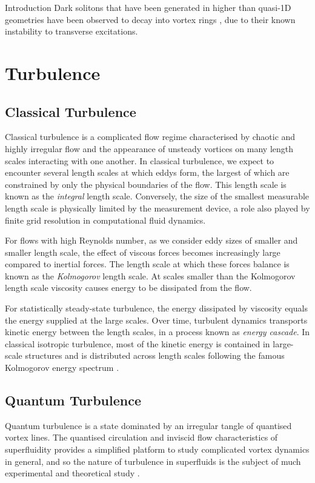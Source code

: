 \begin{chapter}{\label{cha:bose_gases}Introduction}
Dark solitons that have been generated in higher than quasi-1D geometries have been observed to decay into vortex rings \cite{PhysRevLett.86.2926,Dutton27072001,Shomroni09}, due to their known instability to transverse excitations. 


\section{Turbulence}
\subsection{Classical Turbulence}
Classical turbulence is a complicated flow regime characterised by chaotic and highly irregular flow and the appearance of unsteady vortices on many length scales interacting with one another. In classical turbulence, we expect to encounter several length scales at which eddys form, the largest of which are constrained by only the physical boundaries of the flow. This length scale is known as the {\it integral} length scale. Conversely, the size of the smallest measurable length scale is physically limited by the measurement device, a role also played by finite grid resolution in computational fluid dynamics.

For flows with high Reynolds number, as we consider eddy sizes of smaller and smaller length scale, the effect of viscous forces becomes increasingly large compared to inertial forces. The length scale at which these forces balance is known as the {\it Kolmogorov} length scale. At scales smaller than the Kolmogorov length scale viscosity causes energy to be dissipated from the flow.

For statistically steady-state turbulence, the energy dissipated by viscosity equals the energy supplied at the large scales. Over time, turbulent dynamics transports kinetic energy between the length scales, in a process known as {\it energy cascade}. In classical isotropic turbulence, most of the kinetic energy is contained in large-scale structures and is distributed across length scales following the famous Kolmogorov energy spectrum \cite{davidson2004turbulence}.

\subsection{Quantum Turbulence}
Quantum turbulence is a state dominated by an irregular tangle of quantised vortex lines. The quantised circulation and inviscid flow characteristics of superfluidity provides a simplified platform to study complicated vortex dynamics in general, and so the nature of turbulence in superfluids is the subject of much experimental and theoretical study \cite{Bradley11,skebek12,PhysRevLett.110.014502,barenghi_skrbek_14,PhysRevLett.115.155303}.


\end{chapter}
